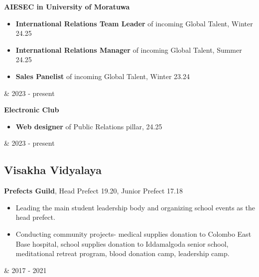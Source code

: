 \documentclass[10pt, a4paper]{article}
\newenvironment{highlights}{
        \begin{itemize}[
                topsep=0pt,
                parsep=0.10 cm,
                partopsep=0pt,
                itemsep=0pt,
                after=\vspace{-1\baselineskip},
                leftmargin=0.4 cm + 3pt
            ]
    }{
        \end{itemize}
    } %
\let\originalTabularx\tabularx
\let\originalEndTabularx\endtabularx
\renewenvironment{tabularx}{\bgroup\centering\originalTabularx}{\originalEndTabularx\par\egroup}
\begin{document}
		\vspace{0.2 cm}
		\begin{tabularx}{\textwidth-0.4 cm-0.13cm}{K{0.2 cm} R{4.1 cm}}
            \textbf{AIESEC in University of Moratuwa}
            \vspace{0.10 cm}
            \begin{highlights}
            \item \textbf{International Relations Team Leader} of incoming Global Talent, Winter 24.25
	        \item \textbf{International Relations Manager} of incoming Global Talent, Summer 24.25
	        \item \textbf{Sales Panelist} of incoming Global Talent, Winter 23.24
	        \end{highlights}
            &
            2023 - present
           \end{tabularx}
           
           \vspace{0.2 cm}
		\begin{tabularx}{\textwidth-0.4 cm-0.13cm}{K{0.2 cm} R{4.1 cm}}
            \textbf{Electronic Club}
            \vspace{0.10 cm}
            \begin{highlights}
            \item \textbf{Web designer} of Public Relations pillar, 24.25
	        \end{highlights}
            &
            2023 - present
           \end{tabularx}
			
		

	\subsection{Visakha Vidyalaya}
		\begin{tabularx}{\textwidth-0.4 cm-0.13cm}{K{0.2 cm} R{4.1 cm}}
            \textbf{Prefects Guild}, Head Prefect 19.20, Junior Prefect 17.18
            \vspace{0.10 cm}
            \begin{highlights}
            \item Leading the main student leadership body and organizing school events as the head prefect.
		\item Conducting community projects- medical supplies donation to Colombo East Base hospital, school supplies donation to Iddamalgoda senior school, meditational retreat program, blood donation camp, leadership camp.
            \end{highlights}
            &
            2017 - 2021
           \end{tabularx}
			
\end{document}
